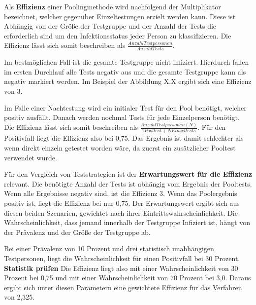 Als \textbf{Effizienz} einer Poolingmethode wird nachfolgend der Multiplikator bezeichnet, welcher gegenüber Einzeltestungen erzielt werden kann.
Diese ist Abhängig von der Größe der Testgruppe und der Anzahl der Tests die erforderlich sind um den Infektionsstatus jeder Person zu klassifizieren.
Die Effizienz lässt sich somit beschreiben als $\frac{Anzahl Testpersonen}{Anzahl Tests} $.

Im bestmöglichen Fall ist die gesamte Testgruppe nicht infiziert.
Hierdurch fallen im ersten Durchlauf alle Tests negativ aus und die gesamte Testgruppe kann als negativ markiert werden.
Im Beispiel der Abbildung X.X ergibt sich eine Effizienz von 3.

Im Falle einer Nachtestung wird ein initialer Test für den Pool benötigt, welcher positiv ausfällt.
Danach werden nochmal Tests für jede Einzelperson benötigt.
Die Effizienz lässt sich somit beschreiben als $\frac{Anzahl Testpersonen (N)}{1 Pooltest + N Einzeltests} $.
Für den Positivfall liegt die Effizienz also bei 0,75.
Das Ergebnis ist damit schlechter als wenn direkt einzeln getestet worden wäre, da zuerst ein zusätzlicher Pooltest verwendet wurde.

Für den Vergleich von Teststrategien ist der \textbf{Erwartungswert für die Effizienz} relevant.
Die benötigte Anzahl der Tests ist abhängig vom Ergebnis der Pooltests.
Wenn alle Ergebnisse negativ sind, ist die Effizienz 3. Wenn das Poolergebnis positiv ist, liegt die Effizienz bei nur 0,75.
Der Erwartungswert ergibt sich aus diesen beiden Szenarien, gewichtet nach ihrer Eintrittswahrscheinlichkeit.
Die Wahrscheinlichkeit, dass jemand innerhalb der Testgruppe Infiziert ist, hängt von der Prävalenz und der Größe der Testgruppe ab.

Bei einer Prävalenz von 10 Prozent und drei statistisch unabhängigen Testpersonen, liegt die Wahrscheinlichkeit für einen Positivfall bei 30 Prozent. \textbf{Statistik prüfen}
Die Effizienz liegt also mit einer Wahrscheinlichkeit von 30 Prozent bei 0,75 und mit einer Wahrscheinlichkeit von 70 Prozent bei 3,0.
Daraus ergibt sich unter diesen Parametern eine gewichtete Effizienz für das Verfahren von 2,325.

\cleardoublepage
